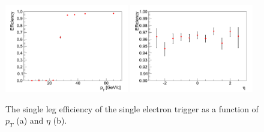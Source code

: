 \begin{figure}[!ht]
\begin{center}
\includegraphics[width=0.48\textwidth]{figures/ElectronTriggerEffVsPt_Ele27Tight.pdf}
\includegraphics[width=0.48\textwidth]{figures/ElectronTriggerEffVsEta_Ele27Tight.pdf}
\end{center}
\caption{The single leg efficiency of the single electron trigger as a function of $p_{T}$ (a) and $\eta$ (b).}
\label{fig:Ele27Efficiency}
\end{figure}












